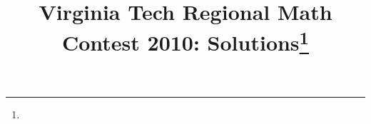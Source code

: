 \documentclass[10pt]{article}
\begin{document}
\title{Virginia Tech Regional Math Contest 2010: Solutions\footnote{\disclaimer}}
\author{\vspace{-2ex}}
\date{\vspace{-5ex}} %
\maketitle

%

%

%

%

%

%

%
\end{document}
